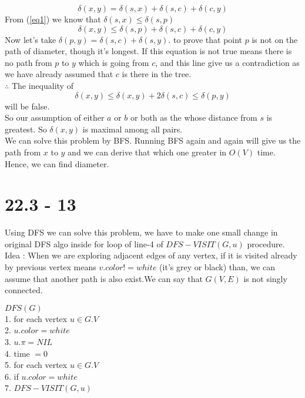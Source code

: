 \documentclass[a4paper, 11pt]{article}
\begin{document}
$$\delta(x,y) = \delta(s,x) + \delta(s,c) + \delta(c,y)$$
From (\ref{eq1}) we know that $\delta(s,x) \le \delta(s,p)$
$$\delta(x,y) \leq \delta(s,p) + \delta(s,c) + \delta(c,y)$$
Now let's take $\delta(p,y) = \delta(s,c) + \delta(s,y).$ to prove that point $p$ is not on the path of diameter, though it's longest. If this equation is not true means there is no path from $p$ to $y$ which is going from $c$, and this line give us a contradiction as we have already assumed that $c$ is there in the tree.\\
$\therefore$ The inequality of
$$\delta(x,y) \le \delta(x,y) + 2 \delta(s,c) \le \delta(p,y)$$
will be false.\\
So our assumption of either $a$ or $b$ or both as the whose distance from $s$ is greatest. So $\delta(x,y)$ is maximal among all pairs.\\
We can solve this problem by BFS. Running BFS again and again will give us the path from $x$ to $y$ and we can derive that which one greater in $O(V)$ time. Hence, we can find diameter.

\section{22.3 - 13}
Using DFS we can solve this problem, we have to make one small change in original DFS algo inside for loop of line-4 of $DFS-VISIT(G,u)$ procedure.\\
Idea : When we are exploring adjacent edges of any vertex, if it is visited already by previous vertex means $v.color != white $ (it's grey or black) than, we can assume that another path is also exist.We can say that $G(V,E)$ is not singly connected.

\vspace{5mm}
\noindent
$DFS(G)$\\
1. for each vertex $ u  \in  G.V $\\
2. \hspace{0.7cm} $u.color = white$\\
3. \hspace{0.7cm} $u.\pi = NIL$\\
4. time $ = 0$\\
5. for each vertex $ u  \in  G.V $\\
6. \hspace{0.7cm} if $u.color = white$\\
7. \hspace{1.4 cm} $DFS-VISIT ( G,u )$
\end{document}
